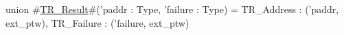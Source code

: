 union #\hyperref[sailRISCVzTRzyResult]{TR\_Result}#('paddr : Type, 'failure : Type) = {
  TR_Address : ('paddr, ext_ptw),
  TR_Failure : ('failure, ext_ptw)
}
